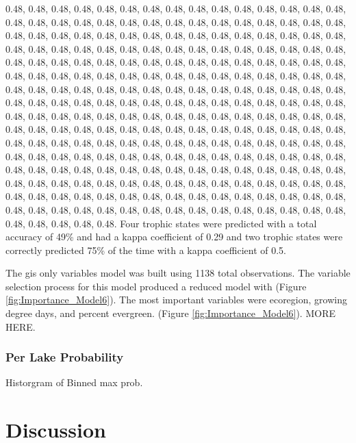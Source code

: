 \documentclass[11pt,]{article}
\begin{document}
0.48, 0.48, 0.48, 0.48, 0.48, 0.48, 0.48, 0.48, 0.48, 0.48, 0.48, 0.48,
0.48, 0.48, 0.48, 0.48, 0.48, 0.48, 0.48, 0.48, 0.48, 0.48, 0.48, 0.48,
0.48, 0.48, 0.48, 0.48, 0.48, 0.48, 0.48, 0.48, 0.48, 0.48, 0.48, 0.48,
0.48, 0.48, 0.48, 0.48, 0.48, 0.48, 0.48, 0.48, 0.48, 0.48, 0.48, 0.48,
0.48, 0.48, 0.48, 0.48, 0.48, 0.48, 0.48, 0.48, 0.48, 0.48, 0.48, 0.48,
0.48, 0.48, 0.48, 0.48, 0.48, 0.48, 0.48, 0.48, 0.48, 0.48, 0.48, 0.48,
0.48, 0.48, 0.48, 0.48, 0.48, 0.48, 0.48, 0.48, 0.48, 0.48, 0.48, 0.48,
0.48, 0.48, 0.48, 0.48, 0.48, 0.48, 0.48, 0.48, 0.48, 0.48, 0.48, 0.48,
0.48, 0.48, 0.48, 0.48, 0.48, 0.48, 0.48, 0.48, 0.48, 0.48, 0.48, 0.48,
0.48, 0.48, 0.48, 0.48, 0.48, 0.48, 0.48, 0.48, 0.48, 0.48, 0.48, 0.48,
0.48, 0.48, 0.48, 0.48, 0.48, 0.48, 0.48, 0.48, 0.48, 0.48, 0.48, 0.48,
0.48, 0.48, 0.48, 0.48, 0.48, 0.48, 0.48, 0.48, 0.48, 0.48, 0.48, 0.48,
0.48, 0.48, 0.48, 0.48, 0.48, 0.48, 0.48, 0.48, 0.48, 0.48, 0.48, 0.48,
0.48, 0.48, 0.48, 0.48, 0.48, 0.48, 0.48, 0.48, 0.48, 0.48, 0.48, 0.48,
0.48, 0.48, 0.48, 0.48, 0.48, 0.48, 0.48, 0.48, 0.48, 0.48, 0.48, 0.48,
0.48, 0.48, 0.48, 0.48, 0.48, 0.48, 0.48, 0.48, 0.48, 0.48, 0.48, 0.48,
0.48, 0.48, 0.48, 0.48, 0.48, 0.48, 0.48, 0.48, 0.48, 0.48, 0.48, 0.48,
0.48, 0.48, 0.48, 0.48, 0.48, 0.48, 0.48, 0.48, 0.48, 0.48, 0.48, 0.48,
0.48, 0.48, 0.48, 0.48, 0.48, 0.48, 0.48, 0.48, 0.48, 0.48, 0.48, 0.48,
0.48, 0.48, 0.48, 0.48, 0.48, 0.48, 0.48, 0.48, 0.48, 0.48, 0.48, 0.48,
0.48, 0.48, 0.48, 0.48, 0.48. Four trophic states were predicted with a
total accuracy of 49\% and had a kappa coefficient of 0.29 and two
trophic states were correctly predicted 75\% of the time with a kappa
coefficient of 0.5.

The gis only variables model was built using 1138 total observations.
The variable selection process for this model produced a reduced model
with (Figure \ref{fig:Importance_Model6}). The most important variables
were ecoregion, growing degree days, and percent evergreen. (Figure
\ref{fig:Importance_Model6}). MORE HERE.

\subsubsection{Per Lake Probability}\label{per-lake-probability-1}

Historgram of Binned max prob.

\section{Discussion}\label{discussion}
\end{document}
